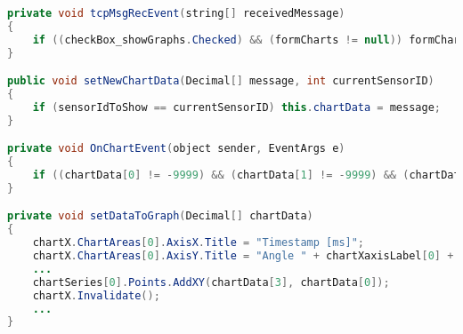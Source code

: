 \label{lst:showGraph}
\begin{lstlisting}[language=Java, caption=Visualisierung anzeigen]
private void tcpMsgRecEvent(string[] receivedMessage)
{
	if ((checkBox_showGraphs.Checked) && (formCharts != null)) formCharts.setNewChartData(messageDataAsDecimal, sensor_joint_ID);
}

public void setNewChartData(Decimal[] message, int currentSensorID)
{
    if (sensorIdToShow == currentSensorID) this.chartData = message;
}

private void OnChartEvent(object sender, EventArgs e)
{
	if ((chartData[0] != -9999) && (chartData[1] != -9999) && (chartData[2] != -9999) && (chartData[3] != -9999)) setDataToGraph(chartData); dataCounter++;
}

private void setDataToGraph(Decimal[] chartData)
{
	chartX.ChartAreas[0].AxisX.Title = "Timestamp [ms]";
	chartX.ChartAreas[0].AxisY.Title = "Angle " + chartXaxisLabel[0] + " [deg]";	
	...	
	chartSeries[0].Points.AddXY(chartData[3], chartData[0]);
	chartX.Invalidate();
	...	
}
\end{lstlisting}